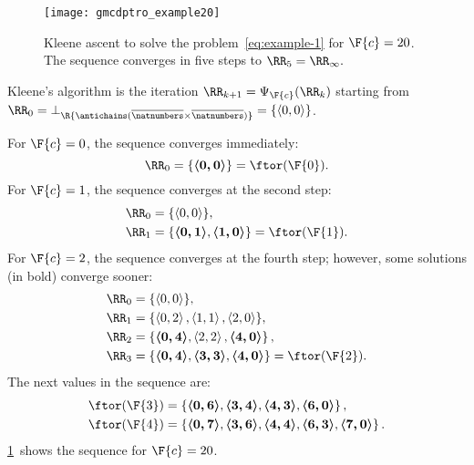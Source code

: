 \begin{figure}
  \begin{centering}
    \texttt{[image: gmcdptro\_example20]}
  \end{centering}
  \caption{\label{fig:example24}Kleene ascent to solve the problem~\cref{eq:example-1}
  for $\F{c}=20$. The sequence converges in five steps to $\RR_{5}=\RR_{\infty}.$ }
\end{figure}

\noindent Kleene's algorithm is the iteration $\RR_{k+1}=\Psi_{\F{c}}(\RR_{k})$
starting from $\RR_{0}=\bot_{\R{\antichains(\overline{\natnumbers}\times\overline{\natnumbers})}}=\{\left\langle 0,0\right\rangle \}$.

\noindent For $\F{c}=0$, the sequence converges immediately:
\[
  \RR_{0}=\{\boldsymbol{\left\langle 0,0\right\rangle }\}=\ftor(\F{0}).
\]
For $\F{c}=1$, the sequence converges at the second step:
\begin{align*}
  \RR_{0} & =\{\left\langle 0,0\right\rangle \},\\
  \RR_{1} & =\{\boldsymbol{\left\langle 0,1\right\rangle },\boldsymbol{\left\langle 1,0\right\rangle }\}=\ftor(\F{1}).
\end{align*}
For $\F{c}=2$, the sequence converges at the fourth step; however,
some solutions (in bold) converge sooner:
\begin{align*}
  \RR_{0} & =\{\left\langle 0,0\right\rangle \},\\
  \RR_{1} & =\{\left\langle 0,2\right\rangle ,\left\langle 1,1\right\rangle ,\left\langle 2,0\right\rangle \},\\
  \RR_{2} & =\left\{ \boldsymbol{\left\langle 0,4\right\rangle },\left\langle 2,2\right\rangle ,\boldsymbol{\left\langle 4,0\right\rangle }\right\} ,\\
  \RR_{3} & =\{\boldsymbol{\left\langle 0,4\right\rangle },\boldsymbol{\left\langle 3,3\right\rangle },\boldsymbol{\left\langle 4,0\right\rangle }\}=\ftor(\F{2}).
\end{align*}
The next values in the sequence are:
\begin{align*}
  \ftor(\F{3}) & =\left\{ \boldsymbol{\left\langle 0,6\right\rangle },\boldsymbol{\left\langle 3,4\right\rangle },\boldsymbol{\left\langle 4,3\right\rangle },\boldsymbol{\left\langle 6,0\right\rangle }\right\} ,\\
  \ftor(\F{4}) & =\left\{ \boldsymbol{\left\langle 0,7\right\rangle },\boldsymbol{\left\langle 3,6\right\rangle },\boldsymbol{\left\langle 4,4\right\rangle },\boldsymbol{\left\langle 6,3\right\rangle },\boldsymbol{\left\langle 7,0\right\rangle }\right\} .
\end{align*}
\cref{fig:example24}~shows the sequence for $\F{c}=20$.

